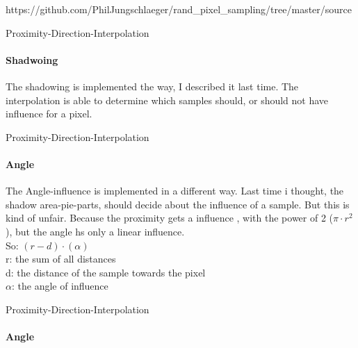 https://github.com/PhilJungschlaeger/rand_pixel_sampling/tree/master/source

\begin{frame}{Proximity-Direction-Interpolation}
\framesubtitle{Shadwoing}
The shadowing is implemented the way, I described it last time. The interpolation is able to determine which samples should, or should not have influence for a pixel.\\ %
\end{frame}

\begin{frame}{Proximity-Direction-Interpolation}
\framesubtitle{Angle}
The Angle-influence is implemented in a different way. Last time i thought, the shadow area-pie-parts, should decide about the influence of a sample. But this is kind of unfair. Because the proximity gets a influence , with the power of 2 (\(\pi \cdot r^2\)), but the angle hs only a linear influence. \\
So:  \((r-d) \cdot (\alpha)\)\\
r: the sum of all distances\\
d: the distance of the sample towards the pixel\\
\(\alpha\): the angle of influence\\
\end{frame}

\begin{frame}{Proximity-Direction-Interpolation}
\framesubtitle{Angle}
\end{frame}


